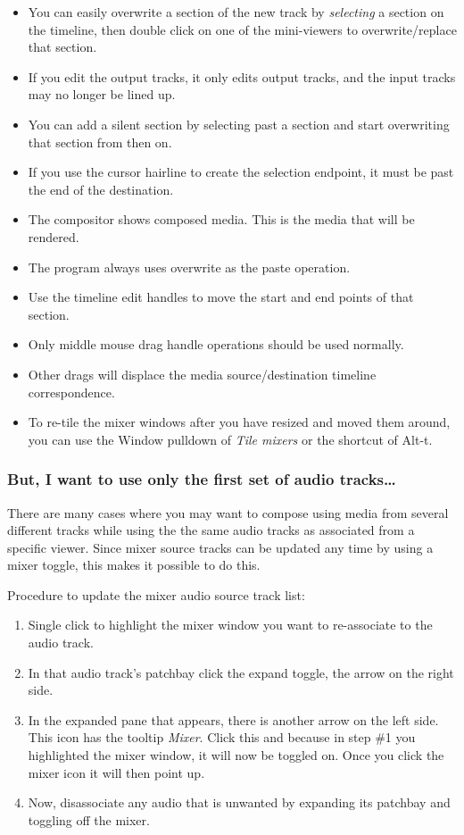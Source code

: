 \begin{itemize}
    \item You can easily overwrite a section of the new track by \textit{selecting} a section on the timeline, then double click on one of the mini-viewers to overwrite/replace that section.
    \item If you edit the output tracks, it only edits output tracks, and the input tracks may no longer be lined up.
    \item You can add a silent section by selecting past a section and start overwriting that section from then on.
    \item If you use the cursor hairline to create the selection endpoint, it must be past the end of the destination.
    \item The compositor shows composed media.  This is the media that will be rendered.
    \item The program always uses overwrite as the paste operation.
    \item Use the timeline edit handles to move the start and end points of that section.
    \item Only middle mouse drag handle operations should be used normally.
    \item Other drags will displace the media source/destination timeline correspondence.
    \item To re-tile the mixer windows after you have resized and moved them around, you can use the Window
    pulldown of \textit{Tile mixers} or the shortcut of Alt-t.
\end{itemize}

\subsubsection*{But, I want to use only the first set of audio tracks\dots}%
\label{ssub:but_use_only_first_audio}

There are many cases where you may want to compose using media from several different tracks while using the the same audio tracks as associated from a specific viewer.  Since mixer source tracks can be updated any time by using a mixer toggle, this makes it possible to do this.  

Procedure to update the mixer audio source track list:

\begin{enumerate}
    \item Single click to highlight the mixer window you want to re-associate to the audio track.
    \item In that audio track’s patchbay click the expand toggle, the arrow on the right side.
    \item In the expanded pane that appears, there is another arrow on the left side.  This icon has the tooltip \textit{Mixer}.  Click this and because in step \#1 you highlighted the mixer window, it will now be toggled on.  Once you click the mixer icon it will then point up.
    \item Now, disassociate any audio that is unwanted by expanding its patchbay and toggling off the mixer.
\end{enumerate}

